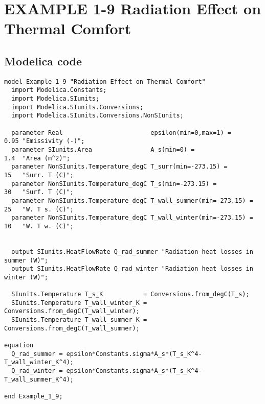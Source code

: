\documentclass{modelica}
\begin{document}
\thispagestyle{empty}
\date{} %

\section*{EXAMPLE 1-9 Radiation Effect on Thermal Comfort}

\subsection*{Modelica code}


\begin{lstlisting}[mathescape=true] 
model Example_1_9 "Radiation Effect on Thermal Comfort"
  import Modelica.Constants;
  import Modelica.SIunits;
  import Modelica.SIunits.Conversions;
  import Modelica.SIunits.Conversions.NonSIunits;

  parameter Real                        epsilon(min=0,max=1) =       0.95 "Emissivity (-)";
  parameter SIunits.Area                A_s(min=0) =                 1.4  "Area (m^2)";
  parameter NonSIunits.Temperature_degC T_surr(min=-273.15) =        15   "Surr. T (C)";
  parameter NonSIunits.Temperature_degC T_s(min=-273.15) =           30   "Surf. T (C)";
  parameter NonSIunits.Temperature_degC T_wall_summer(min=-273.15) = 25   "W. T s. (C)";
  parameter NonSIunits.Temperature_degC T_wall_winter(min=-273.15) = 10   "W. T w. (C)";


  output SIunits.HeatFlowRate Q_rad_summer "Radiation heat losses in summer (W)";
  output SIunits.HeatFlowRate Q_rad_winter "Radiation heat losses in winter (W)";

  SIunits.Temperature T_s_K           = Conversions.from_degC(T_s);
  SIunits.Temperature T_wall_winter_K = Conversions.from_degC(T_wall_winter);
  SIunits.Temperature T_wall_summer_K = Conversions.from_degC(T_wall_summer);

equation 
  Q_rad_summer = epsilon*Constants.sigma*A_s*(T_s_K^4-T_wall_winter_K^4);
  Q_rad_winter = epsilon*Constants.sigma*A_s*(T_s_K^4-T_wall_summer_K^4);
  
end Example_1_9;  
\end{lstlisting}
\end{document}
